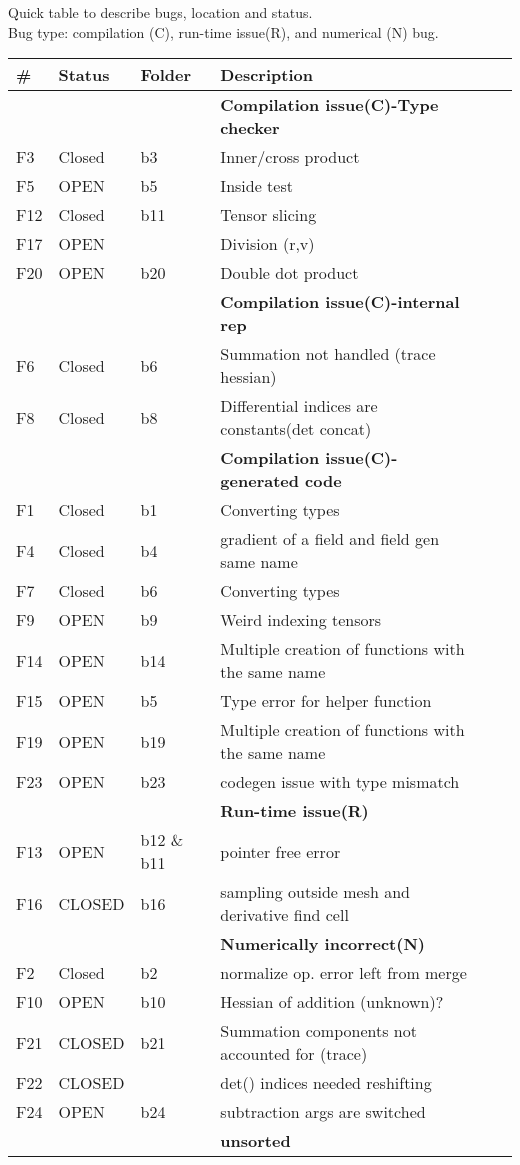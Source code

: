 \documentclass{article}
\begin{document}
Quick table to describe bugs, location and status.\\
Bug type:  compilation (C), run-time issue(R), and numerical (N) bug.\\



\begin{tabular}{|l|ll|lll|}
\hline
\# & Status & Folder & Description \\
\hline
\hline
&&& \textbf{Compilation issue(C)-Type checker}\\
\hline
 F3 &Closed&b3  & Inner/cross product  \\
 F5 &OPEN&b5& Inside test\\
  F12 &Closed & b11 & Tensor slicing\\
F17 &OPEN &   & Division (r,v)\\
  F20 &OPEN & b20  & Double dot product\\
  \hline
  \hline
   &&& \textbf{Compilation issue(C)-internal rep}\\
     \hline
   F6 &Closed &b6  & Summation not handled (trace hessian) \\
     F8 &Closed &b8 &Differential indices are constants(det concat)\\
  \hline
  \hline 
 &&& \textbf{Compilation issue(C)-generated code}\\
 \hline
 F1 &Closed& b1& Converting types\\
  F4 &Closed&b4 & gradient of a field and  field gen same name\\
  F7 &Closed& b6  & Converting types\\
F9 &OPEN&b9 & Weird indexing tensors\\
F14 &OPEN & b14 &Multiple creation of functions with the same name\\
 F15 &OPEN&b5 & Type error for helper function\\
 F19 &OPEN & b19 &Multiple creation of functions with the same name\\
  F23  &OPEN& b23& codegen issue with type mismatch\\
   \hline
  \hline
 &&& \textbf{Run-time issue(R)}\\
 \hline
  F13 &OPEN & b12 \& b11  &pointer free error\\
    F16 &CLOSED & b16  & sampling outside mesh and derivative find cell  \\
  \hline
  \hline
 &&& \textbf{Numerically incorrect(N)}\\
 \hline 
  F2 &Closed &b2  & normalize op. error left from merge\\
  F10 &OPEN &b10 &  Hessian of addition (unknown)?\\
   F21  &CLOSED&b21 &Summation components not accounted for (trace)\\
     F22  &CLOSED& & det() indices needed reshifting\\
     F24  &OPEN& b24& subtraction args are switched \\
  \hline
  \hline
 &&& \textbf{unsorted}\\
 \hline
\end{tabular}
\\





\end{document}
